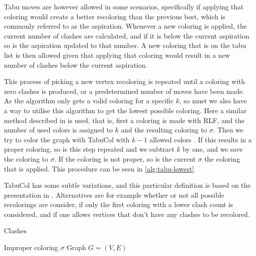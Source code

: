 \documentclass[a4paper]{article}
\begin{document}
Tabu moves are however allowed in some scenarios, specifically if applying that
coloring would create a better recoloring than the previous best, which is
commonly referred to as the aspiration. Whenever a new coloring is applied, the
current number of clashes are calculated, and if it is below the current
aspiration so is the aspiration updated to that number.  A new coloring that is
on the tabu list is then allowed given that applying that coloring would result
in a new number of clashes below the current aspiration.

This process of picking a new vertex recoloring is repeated until a coloring
with zero clashes is produced, or a predetermined number of moves have been
made. As the algorithm only gets a valid coloring for a specific $k$, so must
we also have a way to utilise this algorithm to get the lowest possible
coloring.  Here a similar method described in \cite{Constructive} is used, that
is, first a coloring is made with RLF, and the number of used colors is assigned
to $k$ and the resulting coloring to $\sigma$.  Then we try to color the
graph with TabuCol with $k-1$ allowed colors . If this results in a proper
coloring, so is this step repeated and we subtract $k$ by one, and we save the
coloring to $\sigma$.  If the coloring is not proper, so is the current $\sigma$
the coloring that is applied.  This procedure can be seen in
\autoref{alg:tabu-lowest}


TabuCol has some subtle variations, and this particular definition is based on
the presentation in \cite{Constructive}. Alternatives are for example whether or
not all possible recolorings are consider, if only the first coloring with a
lower clash count is considered, and if one allows vertices that don't have any
clashes to be recolored.

\begin{algorithm}[H]
    \caption{Clashes}
    \begin{algorithmic}[1]
        \REQUIRE Improper coloring $\sigma$
        \REQUIRE Graph $G = (V,E)$
    \end{algorithmic}
\end{algorithm}
\end{document}
